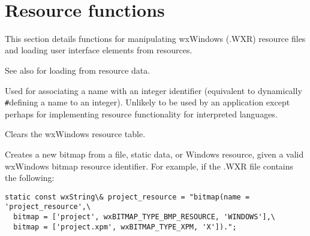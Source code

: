 \\

\section{Resource functions}\label{resourcefuncs}


This section details functions for manipulating wxWindows (.WXR) resource
files and loading user interface elements from resources.



See also  for
loading from resource data.

\label{wxresourceaddidentifier}


Used for associating a name with an integer identifier (equivalent to dynamically\rtfsp
{\tt\#}defining a name to an integer). Unlikely to be used by an application except
perhaps for implementing resource functionality for interpreted languages.

\label{wxresourceclear}


Clears the wxWindows resource table.

\label{wxresourcecreatebitmap}


Creates a new bitmap from a file, static data, or Windows resource, given a valid
wxWindows bitmap resource identifier. For example, if the .WXR file contains
the following:

\begin{verbatim}
static const wxString\& project_resource = "bitmap(name = 'project_resource',\
  bitmap = ['project', wxBITMAP_TYPE_BMP_RESOURCE, 'WINDOWS'],\
  bitmap = ['project.xpm', wxBITMAP_TYPE_XPM, 'X']).";
\end{verbatim}

